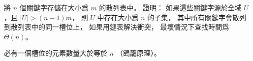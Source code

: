 \startEXERCISE
將 $n$ 個關鍵字存儲在大小爲 $m$ 的散列表中。
證明：
如果這些關鍵字源於全域 $U$，且 $|U| > (n-1)m$，
則 $U$ 中存在大小爲 $n$ 的子集，
其中所有關鍵字會散列到散列表中的同一槽位上，
如果用鏈表解決衝突，
最壞情況下查找時間爲 $\Theta(n)$。
\stopEXERCISE

\startANSWER
必有一個槽位的元素數量大於等於 $n$ （鴿籠原理）。
\stopANSWER
